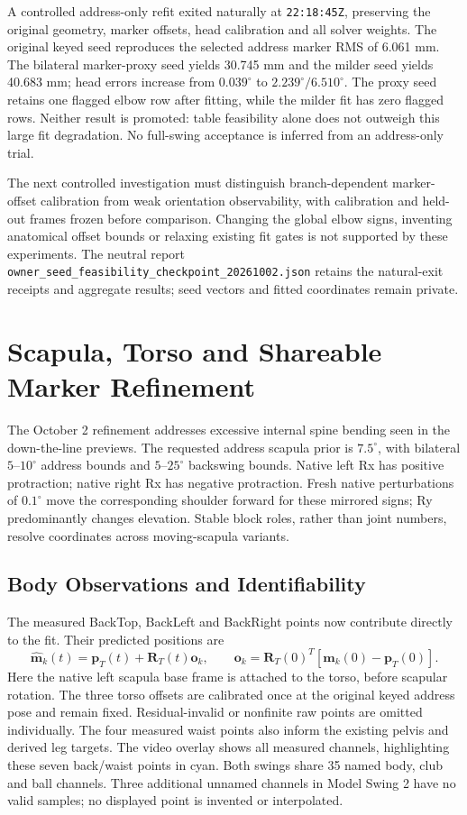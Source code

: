 \documentclass[11pt,a4paper]{article}
\begin{document}
A controlled address-only refit exited naturally at
\texttt{22:18:45Z}, preserving the original geometry, marker offsets,
head calibration and all solver weights. The original keyed seed
reproduces the selected address marker RMS of 6.061 mm. The bilateral
marker-proxy seed yields 30.745 mm and the milder seed yields
40.683 mm; head errors increase from $0.039^\circ$ to
$2.239^\circ/6.510^\circ$. The proxy seed retains one flagged elbow
row after fitting, while the milder fit has zero flagged rows.
Neither result is promoted: table feasibility alone does not outweigh
this large fit degradation. No full-swing acceptance is inferred from
an address-only trial.

The next controlled investigation must distinguish branch-dependent
marker-offset calibration from weak orientation observability, with
calibration and held-out frames frozen before comparison. Changing
the global elbow signs, inventing anatomical offset bounds or relaxing
existing fit gates is not supported by these experiments. The neutral
report \texttt{owner\_seed\_feasibility\_checkpoint\_20261002.json}
retains the natural-exit receipts and aggregate results; seed vectors
and fitted coordinates remain private.
\section{Scapula, Torso and Shareable Marker Refinement}
The October 2 refinement addresses excessive internal spine bending seen in
the down-the-line previews. The requested address scapula prior is
$7.5^\circ$, with bilateral $5$--$10^\circ$ address bounds and
$5$--$25^\circ$ backswing bounds. Native left Rx has positive protraction;
native right Rx has negative protraction. Fresh native perturbations of
$0.1^\circ$ move the corresponding shoulder forward for these mirrored
signs; Ry predominantly changes elevation. Stable block roles, rather than
joint numbers, resolve coordinates across moving-scapula variants.

\subsection{Body Observations and Identifiability}
The measured BackTop, BackLeft and BackRight points now contribute directly
to the fit. Their predicted positions are
\begin{equation}
 \widehat{\mathbf m}_k(t)=\mathbf p_T(t)+\mathbf R_T(t)\mathbf o_k,
 \qquad \mathbf o_k=\mathbf R_T(0)^T
             [\mathbf m_k(0)-\mathbf p_T(0)].
\end{equation}
Here the native left scapula base frame is attached to the torso, before
scapular rotation. The three torso offsets are calibrated once at the
original keyed address pose and remain fixed. Residual-invalid or nonfinite
raw points are omitted individually. The four measured waist points also
inform the existing pelvis and derived leg targets. The video overlay shows
all measured channels, highlighting these seven back/waist points in cyan.
Both swings share 35 named body, club and ball channels. Three additional
unnamed channels in Model Swing 2 have no valid samples; no displayed point
is invented or interpolated.
\end{document}
